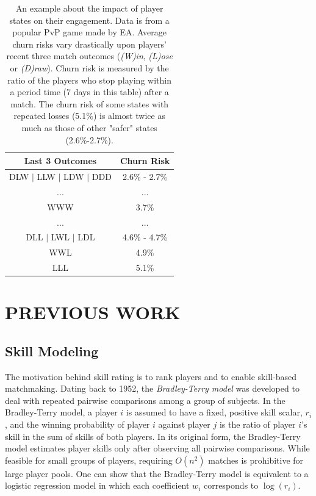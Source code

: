 \begin{table}[tb]
\centering
\caption{
An example about the impact of player states on their engagement. Data is from a popular PvP game made by EA. Average churn risks vary drastically upon players' recent three match outcomes (\emph{(W)in}, \emph{(L)ose} or \emph{(D)raw}). Churn risk is measured by the ratio of the players who stop playing within a period time (7 days in this table) after a match. The churn risk of some states with repeated losses (5.1\%) is almost twice as much as those of other "safer" states (2.6\%-2.7\%).
} \label{tab:churnrate}
\vspace{2mm}
\begin{tabular}{|c|c|}
\hline
Last 3 Outcomes & Churn Risk                      \\ \hline
DLW $|$ LLW $|$ LDW $|$ DDD      &  2.6\% - 2.7\%        \\
... & ...  \\
WWW   &  3.7\% \\
... & ... \\
DLL $|$ LWL $|$ LDL  &  4.6\% - 4.7\%  \\
WWL & 4.9\% \\
LLL & 5.1\% \\
\hline
\end{tabular}
\end{table}


\section{PREVIOUS WORK}\label{sec:review}
\subsection{Skill Modeling}
The motivation behind skill rating is to rank players and to enable skill-based matchmaking. Dating back to 1952, the \textit{Bradley-Terry model} \cite{bradley1952rank} was developed to deal with repeated pairwise comparisons among a group of subjects. In the Bradley-Terry model, a player $i$ is assumed to have a fixed, positive skill scalar, $r_i$, and the winning probability of player $i$ against player $j$ is the ratio of player $i$'s skill in the sum of skills of both players. In its original form, the Bradley-Terry model estimates player skills only after observing all pairwise comparisons. While feasible for small groups of players, requiring $O(n^2)$ matches is prohibitive for large player pools. One can show that the Bradley-Terry model is equivalent to a logistic regression model \cite{agresti2011categorical} in which each coefficient $w_i$ corresponds to $\log(r_i)$.

